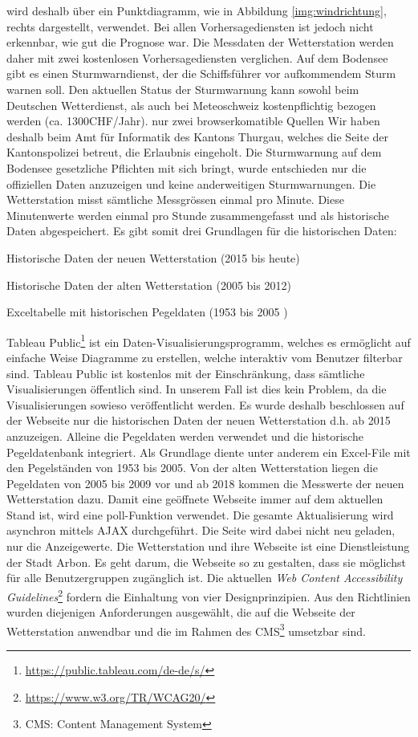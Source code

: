 \documentclass[11pt]{article}
\begin{document}
\begin{multicols}{2}
wird deshalb über ein Punktdiagramm, wie in Abbildung \ref{img:windrichtung}, rechts dargestellt, verwendet. Bei allen Vorhersagediensten ist jedoch nicht erkennbar, wie gut die Prognose war. Die Messdaten der Wetterstation werden daher mit zwei kostenlosen Vorhersagediensten verglichen. Auf dem Bodensee gibt es einen Sturmwarndienst, der die Schiffsführer vor aufkommendem Sturm warnen soll. Den aktuellen Status der Sturmwarnung kann sowohl beim Deutschen Wetterdienst, als auch bei Meteoschweiz kostenpflichtig bezogen werden (ca. 1300CHF/Jahr). nur zwei browserkomatible Quellen Wir haben deshalb beim Amt für Informatik des Kantons Thurgau, welches die Seite der Kantonspolizei betreut, die Erlaubnis eingeholt. Die Sturmwarnung auf dem Bodensee gesetzliche Pflichten mit sich bringt, wurde entschieden nur die offiziellen Daten anzuzeigen und keine anderweitigen Sturmwarnungen. Die Wetterstation misst sämtliche Messgrössen einmal pro Minute. Diese Minutenwerte werden einmal pro Stunde zusammengefasst und als historische Daten abgespeichert. Es gibt somit drei Grundlagen für die historischen Daten:

\begin{itemize*}
\item Historische Daten der neuen Wetterstation (2015 bis heute)
\item Historische Daten der alten Wetterstation (2005 bis 2012)
\item Exceltabelle mit historischen Pegeldaten (1953 bis 2005 )
\end{itemize*}

Tableau Public\footnote{ \url{https://public.tableau.com/de-de/s/}} ist ein Daten-Visualisierungsprogramm, welches es ermöglicht auf einfache Weise Diagramme zu erstellen, welche interaktiv vom Benutzer filterbar sind.  Tableau Public ist kostenlos mit der Einschränkung, dass sämtliche Visualisierungen öffentlich sind. In unserem Fall ist dies kein Problem, da die Visualisierungen sowieso veröffentlicht werden. Es wurde deshalb beschlossen auf der Webseite nur die historischen Daten der neuen Wetterstation d.h. ab 2015 anzuzeigen. Alleine die Pegeldaten werden verwendet und die historische Pegeldatenbank integriert. Als Grundlage diente unter anderem ein Excel-File mit den Pegelständen von 1953 bis 2005. Von der alten Wetterstation liegen die Pegeldaten von 2005 bis 2009 vor und ab 2018 kommen die Messwerte der neuen Wetterstation dazu. Damit eine geöffnete Webseite immer auf dem aktuellen Stand ist, wird eine poll-Funktion verwendet. Die gesamte Aktualisierung wird asynchron mittels AJAX durchgeführt. Die Seite wird dabei nicht neu geladen, nur die Anzeigewerte. Die Wetterstation und ihre Webseite ist eine Dienstleistung der Stadt Arbon. Es geht darum, die Webseite so zu gestalten, dass sie möglichst für alle Benutzergruppen zugänglich ist. Die aktuellen \emph{Web Content Accessibility Guidelines}\footnote{\url{https://www.w3.org/TR/WCAG20/}} fordern die Einhaltung von vier Designprinzipien. Aus den Richtlinien wurden diejenigen Anforderungen ausgewählt, die auf die Webseite der Wetterstation anwendbar und die im Rahmen des CMS\footnote{CMS: Content Management System} umsetzbar sind. 


\end{multicols}
\end{document}

